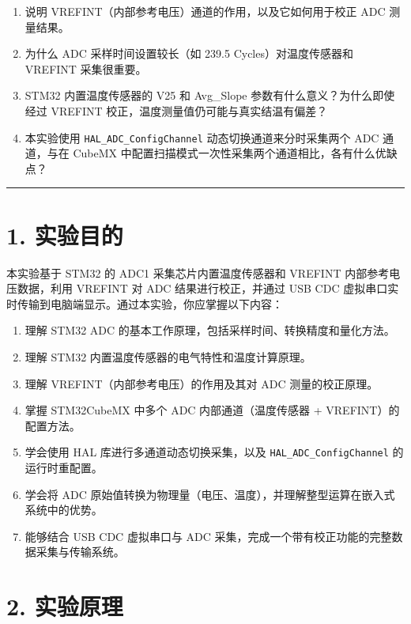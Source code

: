 \documentclass[
  chinese,
  UTF8,
  oneside,
  openany]{ctexbook}
\providecommand{\tightlist}{%
  \setlength{\itemsep}{0pt}\setlength{\parskip}{0pt}}
\begin{document}
\begin{enumerate}
\def\labelenumi{\arabic{enumi}.}
\tightlist
\item
  说明 VREFINT（内部参考电压）通道的作用，以及它如何用于校正 ADC
  测量结果。
\item
  为什么 ADC 采样时间设置较长（如 239.5 Cycles）对温度传感器和 VREFINT
  采集很重要。
\item
  STM32 内置温度传感器的 V25 和 Avg\_Slope
  参数有什么意义？为什么即使经过 VREFINT
  校正，温度测量值仍可能与真实结温有偏差？
\item
  本实验使用 \texttt{HAL\_ADC\_ConfigChannel} 动态切换通道来分时采集两个
  ADC 通道，与在 CubeMX
  中配置扫描模式一次性采集两个通道相比，各有什么优缺点？
\end{enumerate}

\begin{center}\rule{0.5\linewidth}{0.5pt}\end{center}

\section{1. 实验目的}\label{ux5b9eux9a8cux76eeux7684-1}

本实验基于 STM32 的 ADC1 采集芯片内置温度传感器和 VREFINT
内部参考电压数据，利用 VREFINT 对 ADC 结果进行校正，并通过 USB CDC
虚拟串口实时传输到电脑端显示。通过本实验，你应掌握以下内容：

\begin{enumerate}
\def\labelenumi{\arabic{enumi}.}
\tightlist
\item
  理解 STM32 ADC 的基本工作原理，包括采样时间、转换精度和量化方法。
\item
  理解 STM32 内置温度传感器的电气特性和温度计算原理。
\item
  理解 VREFINT（内部参考电压）的作用及其对 ADC 测量的校正原理。
\item
  掌握 STM32CubeMX 中多个 ADC 内部通道（温度传感器 +
  VREFINT）的配置方法。
\item
  学会使用 HAL 库进行多通道动态切换采集，以及
  \texttt{HAL\_ADC\_ConfigChannel} 的运行时重配置。
\item
  学会将 ADC
  原始值转换为物理量（电压、温度），并理解整型运算在嵌入式系统中的优势。
\item
  能够结合 USB CDC 虚拟串口与 ADC
  采集，完成一个带有校正功能的完整数据采集与传输系统。
\end{enumerate}

\section{2. 实验原理}\label{ux5b9eux9a8cux539fux7406}
\end{document}
